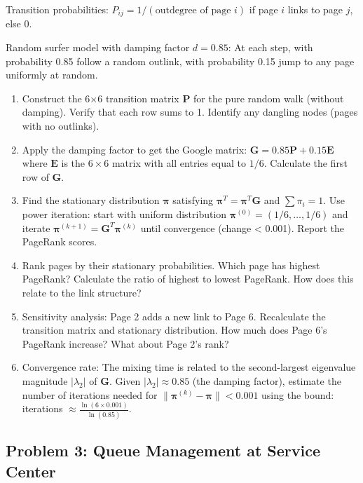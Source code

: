 \documentclass[12pt]{article}
\begin{document}
Transition probabilities: $P_{ij} = 1/(\text{outdegree of page } i)$ if page $i$ links to page $j$, else 0.

Random surfer model with damping factor $d = 0.85$: At each step, with probability 0.85 follow a random outlink, with probability 0.15 jump to any page uniformly at random.

\begin{enumerate}[label=(\alph*)]
\item Construct the 6×6 transition matrix $\mathbf{P}$ for the pure random walk (without damping). Verify that each row sums to 1. Identify any dangling nodes (pages with no outlinks).

\item Apply the damping factor to get the Google matrix: $\mathbf{G} = 0.85\mathbf{P} + 0.15\mathbf{E}$ where $\mathbf{E}$ is the $6 \times 6$ matrix with all entries equal to $1/6$. Calculate the first row of $\mathbf{G}$.

\item Find the stationary distribution $\boldsymbol{\pi}$ satisfying $\boldsymbol{\pi}^T = \boldsymbol{\pi}^T\mathbf{G}$ and $\sum \pi_i = 1$. Use power iteration: start with uniform distribution $\boldsymbol{\pi}^{(0)} = (1/6, \ldots, 1/6)$ and iterate $\boldsymbol{\pi}^{(k+1)} = \mathbf{G}^T\boldsymbol{\pi}^{(k)}$ until convergence (change < 0.001). Report the PageRank scores.

\item Rank pages by their stationary probabilities. Which page has highest PageRank? Calculate the ratio of highest to lowest PageRank. How does this relate to the link structure?

\item Sensitivity analysis: Page 2 adds a new link to Page 6. Recalculate the transition matrix and stationary distribution. How much does Page 6's PageRank increase? What about Page 2's rank?

\item Convergence rate: The mixing time is related to the second-largest eigenvalue magnitude $|\lambda_2|$ of $\mathbf{G}$. Given $|\lambda_2| \approx 0.85$ (the damping factor), estimate the number of iterations needed for $\|\boldsymbol{\pi}^{(k)} - \boldsymbol{\pi}\| < 0.001$ using the bound: iterations $\approx \frac{\ln(6 \times 0.001)}{\ln(0.85)}$.
\end{enumerate}

\subsection*{Problem 3: Queue Management at Service Center}
\end{document}
